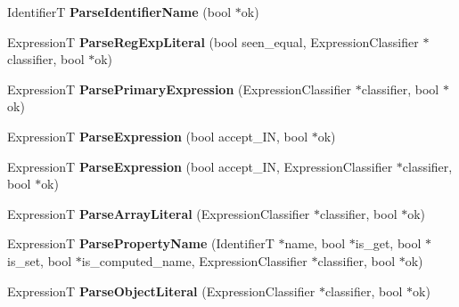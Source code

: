 \begin{DoxyCompactItemize}
\item 
IdentifierT {\bfseries Parse\+Identifier\+Name} (bool $\ast$ok)\hypertarget{classv8_1_1internal_1_1_parser_base_a05cc5aab526a6c429f99cdbad6c7a034}{}\label{classv8_1_1internal_1_1_parser_base_a05cc5aab526a6c429f99cdbad6c7a034}

\item 
ExpressionT {\bfseries Parse\+Reg\+Exp\+Literal} (bool seen\+\_\+equal, Expression\+Classifier $\ast$classifier, bool $\ast$ok)\hypertarget{classv8_1_1internal_1_1_parser_base_a1a80911d1171867a2b6aeecece60b290}{}\label{classv8_1_1internal_1_1_parser_base_a1a80911d1171867a2b6aeecece60b290}

\item 
ExpressionT {\bfseries Parse\+Primary\+Expression} (Expression\+Classifier $\ast$classifier, bool $\ast$ok)\hypertarget{classv8_1_1internal_1_1_parser_base_a126cacf2117375d4868716eada4d6ac5}{}\label{classv8_1_1internal_1_1_parser_base_a126cacf2117375d4868716eada4d6ac5}

\item 
ExpressionT {\bfseries Parse\+Expression} (bool accept\+\_\+\+IN, bool $\ast$ok)\hypertarget{classv8_1_1internal_1_1_parser_base_ac4269fba00462cc1a9f060e6b37ad311}{}\label{classv8_1_1internal_1_1_parser_base_ac4269fba00462cc1a9f060e6b37ad311}

\item 
ExpressionT {\bfseries Parse\+Expression} (bool accept\+\_\+\+IN, Expression\+Classifier $\ast$classifier, bool $\ast$ok)\hypertarget{classv8_1_1internal_1_1_parser_base_aa3eaece8a7285b5d1e7ca33f187b9209}{}\label{classv8_1_1internal_1_1_parser_base_aa3eaece8a7285b5d1e7ca33f187b9209}

\item 
ExpressionT {\bfseries Parse\+Array\+Literal} (Expression\+Classifier $\ast$classifier, bool $\ast$ok)\hypertarget{classv8_1_1internal_1_1_parser_base_ad1d54321e9766ebf1845340976615ce4}{}\label{classv8_1_1internal_1_1_parser_base_ad1d54321e9766ebf1845340976615ce4}

\item 
ExpressionT {\bfseries Parse\+Property\+Name} (IdentifierT $\ast$name, bool $\ast$is\+\_\+get, bool $\ast$is\+\_\+set, bool $\ast$is\+\_\+computed\+\_\+name, Expression\+Classifier $\ast$classifier, bool $\ast$ok)\hypertarget{classv8_1_1internal_1_1_parser_base_aae3fc303b62d19facdcffd6f4ed59fde}{}\label{classv8_1_1internal_1_1_parser_base_aae3fc303b62d19facdcffd6f4ed59fde}

\item 
ExpressionT {\bfseries Parse\+Object\+Literal} (Expression\+Classifier $\ast$classifier, bool $\ast$ok)\hypertarget{classv8_1_1internal_1_1_parser_base_a0fa9e11f0bcfb79483ad5d384443f75a}{}\label{classv8_1_1internal_1_1_parser_base_a0fa9e11f0bcfb79483ad5d384443f75a}


\end{DoxyCompactItemize}
